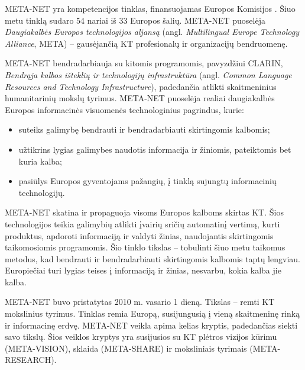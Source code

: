 
\begin{multicols}{2}

META-NET yra kompetencijos tinklas, finansuojamas Europos Komisijos \cite{rehm2011}. Šiuo metu tinklą sudaro 54 nariai iš 33 Europos šalių. META-NET puoselėja \textit{Daugiakalbės Europos technologijos aljansą} (angl. \textit{Multilingual Europe Technology Alliance}, META) – gausėjančią KT profesionalų ir organizacijų bendruomenę.

META-NET bendradarbiauja su kitomis programomis, pavyzdžiui CLARIN, \textit{Bendrąja kalbos išteklių ir technologijų infrastruktūra} (angl. \textit{Common Language Resources and Technology Infrastructure}), padedančia atlikti skaitmeninius humanitarinių mokslų tyrimus. META-NET puoselėja realiai daugiakalbės Europos informacinės visuomenės technologinius pagrindus, kurie:

\begin{itemize}
\item suteiks galimybę bendrauti ir bendradarbiauti skirtingomis kalbomis;
\item užtikrins lygias galimybes naudotis informacija ir žiniomis, pateiktomis bet kuria kalba;
\item pasiūlys Europos gyventojams pažangių, į tinklą sujungtų informacinių technologijų.
\end{itemize}

META-NET skatina ir propaguoja visoms Europos kalboms skirtas KT. Šios technologijos teikia galimybių atlikti įvairių sričių automatinį vertimą, kurti produktus, apdoroti informaciją ir valdyti žinias, naudojantis skirtingomis taikomosiomis programomis. Šio tinklo tikslas – tobulinti šiuo metu taikomus metodus, kad bendrauti ir bendradarbiauti skirtingomis kalbomis taptų lengviau. Europiečiai turi lygias teises į informaciją ir žinias, nesvarbu, kokia kalba jie kalba.

META-NET buvo pristatytas 2010 m. vasario 1 dieną. Tikslas – remti KT mokslinius tyrimus. Tinklas remia Europą, susijungusią į vieną skaitmeninę rinką ir informacinę erdvę. META-NET veikla apima kelias kryptis, padedančias siekti savo tikslų. Šios veiklos kryptys yra susijusios su KT plėtros vizijos kūrimu (META-VISION), sklaida (META-SHARE) ir moksliniais tyrimais (META-RESEARCH).   


\end{multicols}
